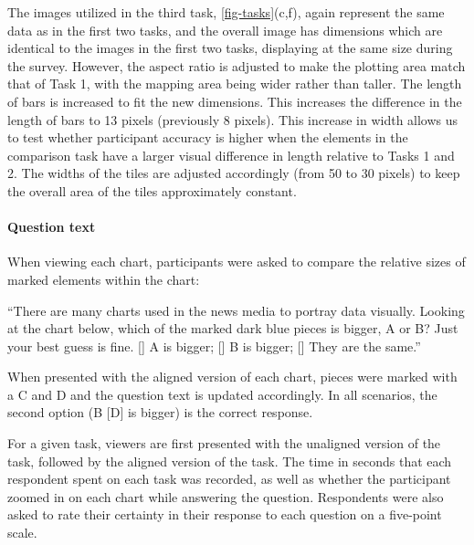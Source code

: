\documentclass[
]{jds}
\let\oldparagraph\paragraph
\renewcommand{\paragraph}[1]{\oldparagraph{#1}\mbox{}}
\begin{document}
The images utilized in the third task, \autoref{fig-tasks}(c,f), again
represent the same data as in the first two tasks, and the overall image
has dimensions which are identical to the images in the first two tasks,
displaying at the same size during the survey. However, the aspect ratio
is adjusted to make the plotting area match that of Task 1, with the
mapping area being wider rather than taller. The length of bars is
increased to fit the new dimensions. This increases the difference in
the length of bars to 13 pixels (previously 8 pixels). This increase in
width allows us to test whether participant accuracy is higher when the
elements in the comparison task have a larger visual difference in
length relative to Tasks 1 and 2. The widths of the tiles are adjusted
accordingly (from 50 to 30 pixels) to keep the overall area of the tiles
approximately constant.

\hypertarget{question-text}{%
\paragraph{Question text}\label{question-text}}

When viewing each chart, participants were asked to compare the relative
sizes of marked elements within the chart:

``There are many charts used in the news media to portray data visually.
Looking at the chart below, which of the marked dark blue pieces is
bigger, A or B? Just your best guess is fine. {[}{]} A is bigger; {[}{]}
B is bigger; {[}{]} They are the same.''

When presented with the aligned version of each chart, pieces were
marked with a C and D and the question text is updated accordingly. In
all scenarios, the second option (B {[}D{]} is bigger) is the correct
response.

For a given task, viewers are first presented with the unaligned version
of the task, followed by the aligned version of the task. The time in
seconds that each respondent spent on each task was recorded, as well as
whether the participant zoomed in on each chart while answering the
question. Respondents were also asked to rate their certainty in their
response to each question on a five-point scale.
\end{document}
